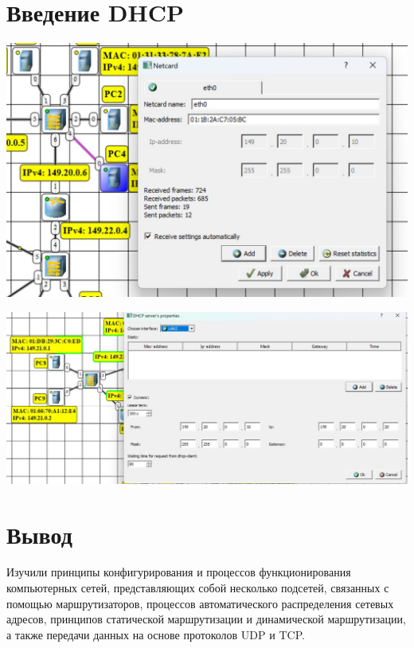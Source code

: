 \documentclass{article}
\begin{document}
\section*{Введение DHCP}
\begin{center}
    \includegraphics[width=.9\textwidth]{4-1}
\end{center}

\begin{center}
    \includegraphics[width=.9\textwidth]{4-2}
\end{center}


\section*{Вывод}
Изучили принципы конфигурирования и процессов функционирования
компьютерных сетей, представляющих собой несколько подсетей, связанных с
помощью маршрутизаторов, процессов автоматического распределения сетевых
адресов, принципов статической маршрутизации и динамической маршрутизации, а также передачи данных на основе протоколов UDP и TCP.
\end{document}
